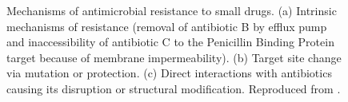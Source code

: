 \begin{figure}[h]
\begin{center}
\caption[Mechanisms of antimicrobial resistance to small drugs]{Mechanisms of antimicrobial resistance to small drugs. (a) Intrinsic mechanisms of resistance (removal of antibiotic B by efflux pump and inaccessibility of antibiotic C to the Penicillin Binding Protein target because of membrane impermeability). (b) Target site change via mutation or protection. (c) Direct interactions with antibiotics causing its disruption or structural modification. Reproduced from \cite{Blair2014}.} \label{fig:amr}
\end{center}
\end{figure}

